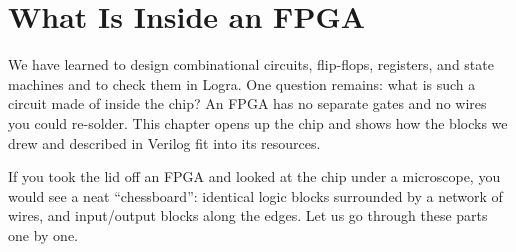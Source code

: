 \chapter{What Is Inside an FPGA}
\label{ch:inside}

We have learned to design combinational circuits, flip-flops, registers, and
state machines and to check them in Logra. One question remains: what is such a
circuit made of inside the chip? An FPGA has no separate gates and no wires you
could re-solder. This chapter opens up the chip and shows how the blocks we drew
and described in Verilog fit into its resources.

If you took the lid off an FPGA and looked at the chip under a microscope,
you would see a neat ``chessboard'': identical logic blocks surrounded by
a network of wires, and input/output blocks along the edges. Let us go
through these parts one by one.

